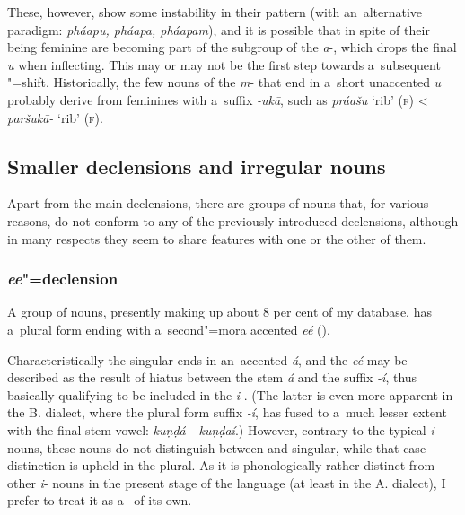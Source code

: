 These, however, show some instability in their  pattern (with an~alternative paradigm: \textit{pháapu, pháapa, pháapam}), and it is possible that in spite of their being feminine are becoming part of the subgroup of the \textit{a}-, which drops the final \textit{u} when inflecting. This may or may not be the first step towards a~subsequent "=shift. Historically, the few nouns of the \textit{m}- that end in a~short unaccented \textit{u} probably derive from  feminines with a~suffix \textit{-ukā}, such as \textit{práašu} `rib' (\textsc{f}) {\textless} \textit{paršukā-} `rib' (\textsc{f}).

\subsection{Smaller declensions and irregular nouns}
\label{subsec:4-6-4}

Apart from the main declensions, there are groups of nouns that, for various reasons, do not conform to any of the previously introduced declensions, although in many respects they seem to share features with one or the other of them.

\subsubsection*{\textit{ee}"=declension}

A group of nouns, presently making up about 8 per cent of my database, has a~plural form ending with a~second"=mora accented \textit{eé} (). 


Characteristically the  singular ends in an~accented \textit{á}, and the \textit{eé} may be described as the result of hiatus between the stem \textit{á} and the suffix \textit{-í}, thus basically qualifying to be included in the \textit{i}-. (The latter is even more apparent in the B. dialect, where the plural form suffix \textit{-í}, has fused to a~much lesser extent with the final stem vowel: \textit{kuṇḍá -} \textit{kuṇḍaí}.) However, contrary to the typical \textit{i}- nouns, these nouns do not distinguish between  and  singular, while that case distinction is upheld in the plural. As it is phonologically rather distinct from other \textit{i}- nouns in the present stage of the language (at least in the A. dialect), I prefer to treat it as a~ of its own.


